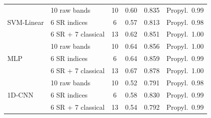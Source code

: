\documentclass[review,authoryear]{elsarticle}
\begin{document}
\begin{table}[ht]
\begin{tabular}{llcccc}
\midrule
\multirow{3}{*}{SVM-Linear}
  & 10 raw bands & 10 & 0.60 & 0.835 & Propyl.\ 0.99 \\
  & 6 SR indices & 6 & 0.57 & 0.813 & Propyl.\ 0.98 \\
  & 6 SR + 7 classical & 13 & 0.62 & 0.851 & Propyl.\ 1.00 \\
\midrule
\multirow{3}{*}{MLP}
  & 10 raw bands & 10 & 0.64 & 0.856 & Propyl.\ 1.00 \\
  & 6 SR indices & 6 & 0.64 & 0.859 & Propyl.\ 0.99 \\
  & 6 SR + 7 classical & 13 & 0.67 & 0.878 & Propyl.\ 1.00 \\
\midrule
\multirow{3}{*}{1D-CNN}
  & 10 raw bands & 10 & 0.52 & 0.791 & Propyl.\ 0.98 \\
  & 6 SR indices & 6 & 0.58 & 0.830 & Propyl.\ 0.99 \\
  & 6 SR + 7 classical & 13 & 0.54 & 0.792 & Propyl.\ 0.99 \\
\bottomrule
\end{tabular}
\end{table}
\end{document}
